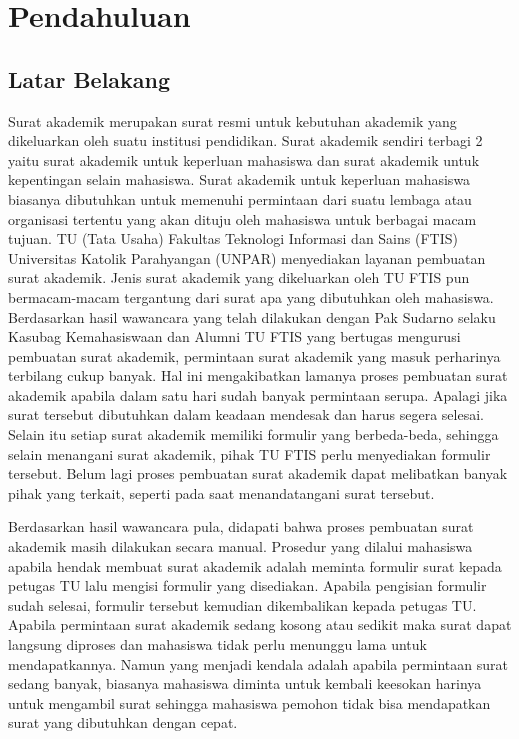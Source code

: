 \chapter{Pendahuluan}
\label{chap:pendahuluan}

\section{Latar Belakang}
\label{sec:latar_belakang}
Surat akademik merupakan surat resmi untuk kebutuhan akademik yang dikeluarkan oleh suatu institusi pendidikan. Surat akademik sendiri terbagi 2 yaitu surat akademik untuk keperluan mahasiswa dan surat akademik untuk kepentingan selain mahasiswa. Surat akademik untuk keperluan mahasiswa biasanya dibutuhkan untuk memenuhi permintaan dari suatu lembaga atau organisasi tertentu yang akan dituju oleh mahasiswa untuk berbagai macam tujuan. TU (Tata Usaha) Fakultas Teknologi Informasi dan Sains (FTIS) Universitas Katolik Parahyangan (UNPAR) menyediakan layanan pembuatan surat akademik. Jenis surat akademik yang dikeluarkan oleh TU FTIS pun bermacam-macam tergantung dari surat apa yang dibutuhkan oleh mahasiswa. Berdasarkan hasil wawancara yang telah dilakukan dengan Pak Sudarno selaku Kasubag Kemahasiswaan dan Alumni TU FTIS yang bertugas mengurusi pembuatan surat akademik, permintaan surat akademik yang masuk perharinya terbilang cukup banyak. Hal ini mengakibatkan lamanya proses pembuatan surat akademik apabila dalam satu hari sudah banyak permintaan serupa. Apalagi jika surat tersebut dibutuhkan dalam keadaan mendesak dan harus segera selesai. Selain itu setiap surat akademik memiliki formulir yang berbeda-beda, sehingga selain menangani surat akademik, pihak TU FTIS perlu menyediakan formulir tersebut. Belum lagi proses pembuatan surat akademik dapat melibatkan banyak pihak yang terkait, seperti pada saat menandatangani surat tersebut.  \

Berdasarkan hasil wawancara pula, didapati bahwa proses pembuatan surat akademik masih dilakukan secara manual. Prosedur yang dilalui mahasiswa apabila hendak membuat surat akademik adalah meminta formulir surat kepada petugas TU lalu mengisi formulir yang disediakan. Apabila pengisian formulir sudah selesai, formulir tersebut kemudian dikembalikan kepada petugas TU. Apabila permintaan surat akademik sedang kosong atau sedikit maka surat dapat langsung diproses dan mahasiswa tidak perlu menunggu lama untuk mendapatkannya. Namun yang menjadi kendala adalah apabila permintaan surat sedang banyak, biasanya mahasiswa diminta untuk kembali keesokan harinya untuk mengambil surat sehingga mahasiswa pemohon tidak bisa mendapatkan surat yang dibutuhkan dengan cepat. \

